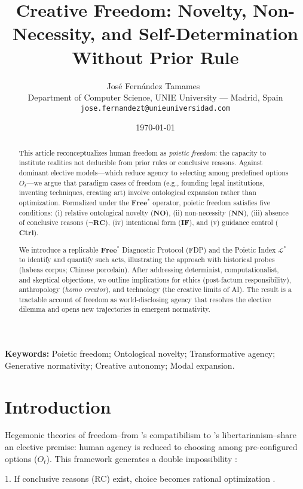 \documentclass[11pt,a4paper]{article}
\title{Creative Freedom: Novelty, Non-Necessity, and Self-Determination Without Prior Rule}
\author{%
  José Fernández Tamames~\orcidlink{0009-0007-8851-9833}\\
  Department of Computer Science, UNIE University --- Madrid, Spain\\
  \texttt{jose.fernandezt@unieuniversidad.com}
}
\date{\today}
\newcommand{\Free}{\ensuremath{\mathbf{Free}^{\ast}}}
\newcommand{\Ot}{\ensuremath{O_{t}}}
\newcommand{\NO}{\ensuremath{\mathbf{NO}}}
\newcommand{\NN}{\ensuremath{\mathbf{NN}}}
\newcommand{\NotRC}{\ensuremath{\lnot\mathbf{RC}}}
\newcommand{\IFc}{\ensuremath{\mathbf{IF}}}
\newcommand{\Ctrl}{\ensuremath{\mathbf{Ctrl}}}
\newcommand{\Lstar}{\ensuremath{\mathcal{L}^{\ast}}}
\begin{document}
\maketitle
\doclicenseThis

\textbf{Keywords:} Poietic freedom; Ontological novelty; Transformative agency; Generative normativity; Creative autonomy; Modal expansion.

\begin{abstract}
This article reconceptualizes human freedom as \emph{poietic freedom}: the capacity to institute realities not deducible from prior rules or conclusive reasons. Against dominant elective models---which reduce agency to selecting among predefined options $\Ot$---we argue that paradigm cases of freedom (e.g., founding legal institutions, inventing techniques, creating art) involve ontological expansion rather than optimization. Formalized under the $\Free$ operator, poietic freedom satisfies five conditions: (i) relative ontological novelty ($\NO$), (ii) non-necessity ($\NN$), (iii) absence of conclusive reasons ($\NotRC$), (iv) intentional form ($\IFc$), and (v) guidance control ($\Ctrl$).

We introduce a replicable $\Free$ Diagnostic Protocol (FDP) and the Poietic Index $\Lstar$ to identify and quantify such acts, illustrating the approach with historical probes (habeas corpus; Chinese porcelain). After addressing determinist, computationalist, and skeptical objections, we outline implications for ethics (post-factum responsibility), anthropology (\emph{homo creator}), and technology (the creative limits of AI). The result is a tractable account of freedom as world-disclosing agency that resolves the elective dilemma and opens new trajectories in emergent normativity.
\end{abstract}

\section{Introduction}\label{sec:intro}

Hegemonic theories of freedom--from \cite{fischer1998}'s compatibilism to \cite{kane2023}'s libertarianism--share an elective premise: human agency is reduced to choosing among pre-configured options (\(O_{t}\)). This framework generates a double impossibility \cite[ p. 850]{torres2022}:

1. If conclusive reasons (RC) exist, choice becomes rational optimization \cite[ p. 92]{chang2017}.
\end{document}
